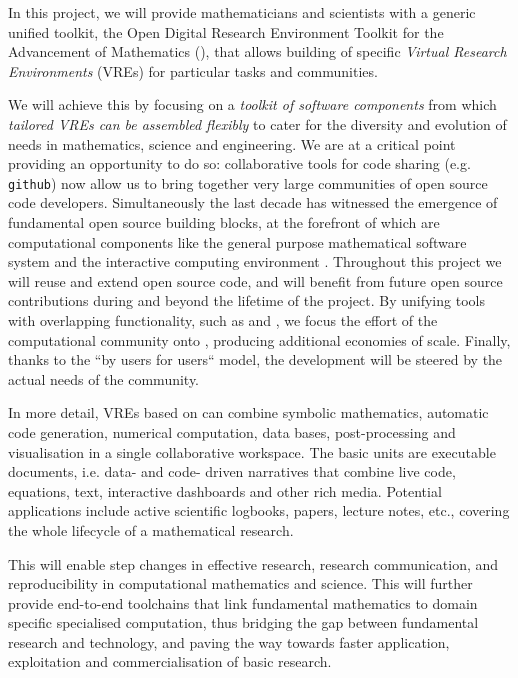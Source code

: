 In this project, we will provide mathematicians and scientists with a
generic unified toolkit, the Open Digital Research Environment Toolkit
for the Advancement of Mathematics (\TheProject), that allows
building of specific \emph{Virtual Research Environments} (VREs) for
particular tasks and communities.


We will achieve this by focusing on a \emph{toolkit of software
  components} from which \emph{tailored VREs can be assembled
  flexibly} to cater for the diversity and evolution of needs in
mathematics, science and engineering.  We are at a critical point providing
an opportunity to do so: collaborative tools for code sharing (e.g.
\texttt{github}) now allow us to bring together very large communities
of open source code developers. %
Simultaneously the last decade has witnessed the emergence of fundamental
open source building blocks, at the forefront of which are computational
components like the general purpose mathematical software system \Sage
and the interactive computing environment \Jupyter.
Throughout this project we will reuse and extend open source code, and
\TheProject will benefit from future open source contributions during
and beyond the lifetime of the project. By unifying tools with
overlapping functionality, such as \Jupyter and \Sage, we focus the
effort of the computational community onto \TheProject, producing
additional economies of scale. Finally, thanks to the ``by users for
users`` model, the development will be steered by the actual needs of
the community.

In more detail, VREs based on \TheProject can combine symbolic
mathematics, automatic code generation, numerical computation, data
bases, post-processing and visualisation in a single collaborative
workspace. The basic units are executable documents, i.e. data- and
code- driven narratives that combine live code, equations, text,
interactive dashboards and other rich media. Potential applications
include active scientific logbooks, papers, lecture notes, etc.,
covering the whole lifecycle of a mathematical research.

This will enable step changes in effective research, research
communication, and reproducibility in computational mathematics and
science. This will further provide end-to-end toolchains that link
fundamental mathematics to domain specific specialised computation,
thus bridging the gap between fundamental research and technology, and
paving the way towards faster application, exploitation and
commercialisation of basic research.

